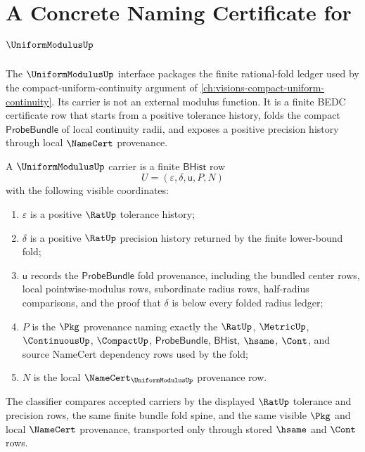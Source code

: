 \chapter{A Concrete Naming Certificate for $\UniformModulusUp$}
\label{ch:concrete-instances-uniformmodulus-namecert}

The $\UniformModulusUp$ interface packages the finite rational-fold ledger used
by the compact-uniform-continuity argument of
\autoref{ch:visions-compact-uniform-continuity}. Its carrier is not an external
modulus function. It is a finite BEDC certificate row that starts from a
positive tolerance history, folds the compact $\mathsf{ProbeBundle}$ of local
continuity radii, and exposes a positive precision history through local
$\NameCert$ provenance.

\begin{definition}
\label{def:uniform-modulus-ledger-carrier}
A $\UniformModulusUp$ carrier is a finite $\mathsf{BHist}$ row
$$
U=(\varepsilon,\delta,\mathsf{u},P,N)
$$
with the following visible coordinates:
\begin{enumerate}
\item $\varepsilon$ is a positive $\RatUp$ tolerance history;
\item $\delta$ is a positive $\RatUp$ precision history returned by the finite
lower-bound fold;
\item $\mathsf{u}$ records the $\mathsf{ProbeBundle}$ fold provenance, including
the bundled center rows, local pointwise-modulus rows, subordinate radius rows,
half-radius comparisons, and the proof that $\delta$ is below every folded
radius ledger;
\item $P$ is the $\Pkg$ provenance naming exactly the $\RatUp$, $\MetricUp$,
$\ContinuousUp$, $\CompactUp$, $\mathsf{ProbeBundle}$, $\mathsf{BHist}$,
$\hsame$, $\Cont$, and source NameCert dependency rows used by the fold;
\item $N$ is the local $\NameCert_{\UniformModulusUp}$ provenance row.
\end{enumerate}
The classifier compares accepted carriers by the displayed $\RatUp$ tolerance
and precision rows, the same finite bundle fold spine, and the same visible
$\Pkg$ and local $\NameCert$ provenance, transported only through stored
$\hsame$ and $\Cont$ rows.
\end{definition}

